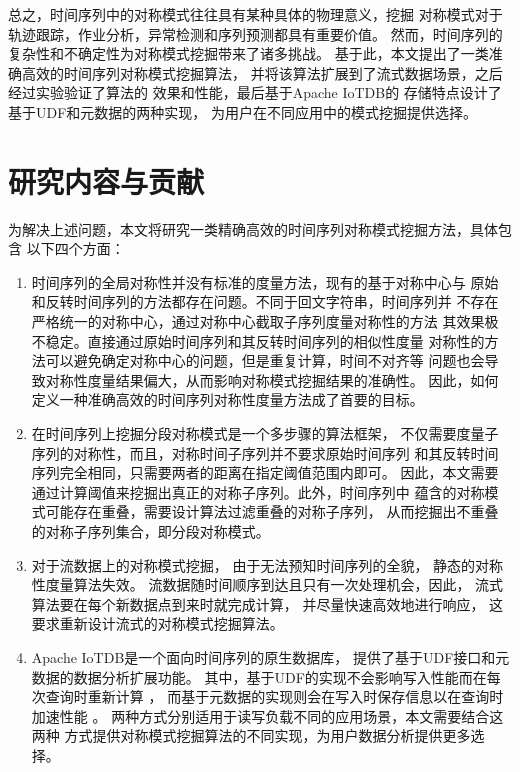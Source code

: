 总之，时间序列中的对称模式往往具有某种具体的物理意义，挖掘
对称模式对于轨迹跟踪，作业分析，异常检测和序列预测都具有重要价值。
然而，时间序列的复杂性和不确定性为对称模式挖掘带来了诸多挑战。
基于此，本文提出了一类准确高效的时间序列对称模式挖掘算法，
并将该算法扩展到了流式数据场景，之后经过实验验证了算法的
效果和性能，最后基于Apache IoTDB\cite{10.14778/3415478.3415504}的
存储特点设计了基于UDF和元数据的两种实现，
为用户在不同应用中的模式挖掘提供选择。


\section{研究内容与贡献}
为解决上述问题，本文将研究一类精确高效的时间序列对称模式挖掘方法，具体包含
以下四个方面：
\begin{enumerate}
  \item 时间序列的全局对称性并没有标准的度量方法，现有的基于对称中心与
  原始和反转时间序列的方法都存在问题。不同于回文字符串，时间序列并
  不存在严格统一的对称中心，通过对称中心截取子序列度量对称性的方法
  其效果极不稳定。直接通过原始时间序列和其反转时间序列的相似性度量
  对称性的方法可以避免确定对称中心的问题，但是重复计算，时间不对齐等
  问题也会导致对称性度量结果偏大，从而影响对称模式挖掘结果的准确性。
  因此，如何定义一种准确高效的时间序列对称性度量方法成了首要的目标。
  \item 在时间序列上挖掘分段对称模式是一个多步骤的算法框架，
  不仅需要度量子序列的对称性，而且，对称时间子序列并不要求原始时间序列
  和其反转时间序列完全相同，只需要两者的距离在指定阈值范围内即可。
  因此，本文需要通过计算阈值来挖掘出真正的对称子序列。此外，时间序列中
  蕴含的对称模式可能存在重叠，需要设计算法过滤重叠的对称子序列，
  从而挖掘出不重叠的对称子序列集合，即分段对称模式。
  \item 对于流数据上的对称模式挖掘，
  由于无法预知时间序列的全貌，
  静态的对称性度量算法失效。
  流数据随时间顺序到达且只有一次处理机会，因此，
  流式算法要在每个新数据点到来时就完成计算，
  并尽量快速高效地进行响应，
  这要求重新设计流式的对称模式挖掘算法。
  \item Apache IoTDB是一个面向时间序列的原生数据库，
  提供了基于UDF接口和元数据的数据分析扩展功能。
  其中，基于UDF的实现不会影响写入性能而在每次查询时重新计算
  \cite{DBLP:journals/jiis/Castro-LopezBL20}，
  而基于元数据的实现则会在写入时保存信息以在查询时加速性能
  \cite{DBLP:phd/hal/Zhang19c}。
  两种方式分别适用于读写负载不同的应用场景，本文需要结合这两种
  方式提供对称模式挖掘算法的不同实现，为用户数据分析提供更多选择。
  
\end{enumerate}

